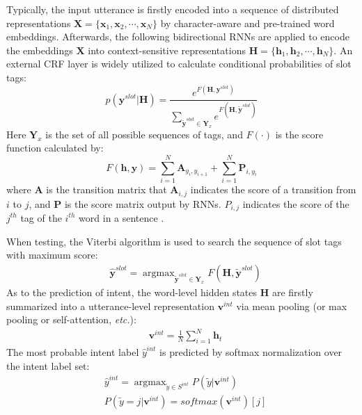 \documentclass[11pt,a4paper]{article}
\begin{document}
Typically, the input utterance is firstly encoded into a sequence of distributed representations $\mathbf{X} = \{\mathbf{x}_1, \mathbf{x}_2, \cdots, \mathbf{x}_N\}$ by character-aware and pre-trained word embeddings. Afterwards, the following bidirectional RNNs are applied to encode the embeddings $\mathbf{X}$ into context-sensitive representations $\mathbf{H} = \{\mathbf{h}_1, \mathbf{h}_2, \cdots, \mathbf{h}_N\}$. An external CRF \cite{CRF} layer is widely utilized to calculate conditional probabilities of slot tags:
\begin{equation}
        p (\mathbf{y}^{slot}|\mathbf{H}) = \frac{e^{F(\mathbf{H},\mathbf{y}^{slot})}}
        { \sum_{\widetilde{\mathbf{y}}^{slot} \in  \mathbf{Y}_x } e ^ { F (\mathbf{H}, \widetilde{\mathbf{y}}^{slot}) } } 
    \label{background_slot_crf}
\end{equation}
Here $\mathbf{Y}_x$ is the set of all possible sequences of tags, and $F(\cdot)$ is the score function calculated by:
\begin{equation}
        F(\mathbf{h},\mathbf{y}) = \sum_{i=1}^{N}{\mathbf{A}_{y_i, y_{i+1}}} + 
        \sum_{i=1}^{N}{\mathbf{P}_{i,y_i}}
        \label{background_crf_score}
\end{equation}
where $\mathbf{A}$ is the transition matrix that $\mathbf{A}_{i,j}$ indicates the score of a transition from $i$ to $j$, and $\mathbf{P}$ is the score matrix  output by RNNs. $P_{i,j}$ indicates the score of the $j^{th}$ tag of the $i^{th}$ word in a sentence \cite{lample_2016}.

When testing, the Viterbi algorithm \cite{viterbi} is used to search the sequence of slot tags with maximum score:
\begin{equation}
    \begin{split}
        & \hat{\mathbf{y}}^{slot} = \mathop{\arg\max} _ {\widetilde{\mathbf{y}}^{slot} \in \mathbf{Y}_x } F (\mathbf{H}, \widetilde{\mathbf{y}}^{slot} )
        \label{background_slot_pred}
    \end{split}
\end{equation}
As to the prediction of intent, the word-level hidden states $\mathbf{H}$ are firstly summarized into a utterance-level representation $\mathbf{v}^{int}$ via mean pooling (or max pooling or self-attention, {\em etc.}):
\begin{equation}
    \begin{split}
        & \mathbf{v}^{int} = \frac{1}{N} \sum_{i=1}^{N}{\mathbf{h}_t} 
    \end{split}
    \label{background_intent_rep}
\end{equation}
The most probable intent label $\hat{y}^{int}$ is predicted by softmax normalization over the intent label set:
\begin{equation}
    \begin{split}
        & \hat{y}^{int} = \mathop{\arg\max} _ {\widetilde{y} \in S^{int} } P (\widetilde{y} | \mathbf{v}^{int} ) \\
        & P(\widetilde{y} = j| \mathbf{v}^{int} ) = softmax(\mathbf{v}^{int})[j] 
    \end{split}
    \label{background_intent_pred}
\end{equation}
\end{document}
